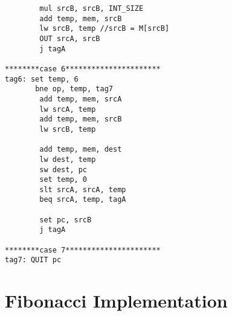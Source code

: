 \documentclass{article}
\begin{document}
\begin{verbatim}
        mul srcB, srcB, INT_SIZE
        add temp, mem, srcB
        lw srcB, temp //srcB = M[srcB]
        OUT srcA, srcB
        j tagA

********case 6**********************
tag6: set temp, 6
       bne op, temp, tag7
        add temp, mem, srcA
        lw srcA, temp
        add temp, mem, srcB
        lw srcB, temp

        add temp, mem, dest
        lw dest, temp
        sw dest, pc
        set temp, 0
        slt srcA, srcA, temp
        beq srcA, temp, tagA

        set pc, srcB
        j tagA

********case 7**********************
tag7: QUIT pc
\end{verbatim}

\section{Fibonacci Implementation}
\end{document}
